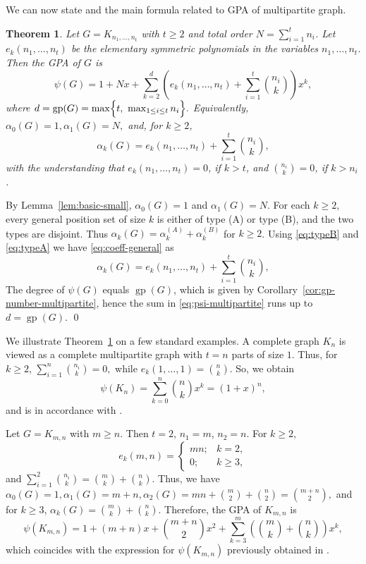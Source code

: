 \documentclass[12pt,twoside]{article}
\newtheorem{theorem}{Theorem}[section]
\renewenvironment{proof}{{\noindent\bfseries Proof.}}{\qed}
\begin{document}
	We can now state and the main formula related to  GPA of multipartite graph.
		\begin{theorem}\label{thm:psi-multipartite}
		Let \(G=K_{n_1,\dots,n_t}\) with \(t\ge 2\) and total order \(N=\sum_{i=1}^t n_i\). Let \(e_k(n_1,\dots,n_t)\) be the elementary symmetric polynomials in the variables \(n_1,\dots,n_t\). Then the GPA of \(G\) is
		\begin{equation}\label{eq:psi-multipartite}
			\psi(G)
			= 1 + N x + \sum_{k=2}^{d} \left( e_k(n_1,\dots,n_t) + \sum_{i=1}^t \binom{n_i}{k} \right)x^k,
		\end{equation}
		where $d = \operatorname{gp}(G) 
		= \max\Bigl\{ t,\ \max_{1\le i\le t} n_i \Bigr\}.$ Equivalently, $\alpha_0(G)=1, \alpha_1(G)=N,$ and, for \(k\ge 2\),
		\begin{equation}\label{eq:coeff-general}
			\alpha_k(G)
			= e_k(n_1,\dots,n_t) + \sum_{i=1}^t \binom{n_i}{k},
		\end{equation}
		with the understanding that \(e_k(n_1,\dots,n_t)=0\), if \(k>t\), and \(\binom{n_i}{k}=0\), if \(k>n_i\).
	\end{theorem}
	
	\begin{proof}
		By Lemma~\ref{lem:basic-small}, \(\alpha_0(G)=1\) and \(\alpha_1(G)=N\). For each \(k\ge 2\), every general position set of size \(k\) is either of type (A) or type (B), and the two types are disjoint. Thus $\alpha_k(G)=\alpha_k^{(A)}+\alpha_k^{(B)}$ 	for \(k\ge 2\). Using \eqref{eq:typeB} and \eqref{eq:typeA} we have \eqref{eq:coeff-general} as
		\[
		\alpha_k(G)=e_k(n_1,\dots,n_t)+\sum_{i=1}^t \binom{n_i}{k},
		\]
		 The degree of \(\psi(G)\) equals \(\operatorname{gp}(G)\), which is given by Corollary~\ref{cor:gp-number-multipartite}, hence the sum in \eqref{eq:psi-multipartite} runs up to \(d=\operatorname{gp}(G)\).
	\end{proof}
	
	 We  illustrate Theorem~\ref{thm:psi-multipartite} on a few standard examples. A complete graph \(K_n\) is viewed as a complete multipartite graph with \(t=n\) parts of size $1$. Thus, for \(k\ge 2\), $\sum_{i=1}^n \binom{n_i}{k} = 0,$ while
		$e_k(1,\dots,1)=\binom{n}{k}.$ So, we obtain
		\[
		\psi(K_n)=\sum_{k=0}^n \binom{n}{k}x^k = (1+x)^n,
		\]
		and is in accordance with \cite[Proposition 2.1(i)]{0}.
	
	Let \(G=K_{m,n}\) with \(m\ge n\). Then \(t=2\), \(n_1=m\), \(n_2=n\). For \(k\ge 2\),
		\[
		e_k(m,n)
		=
		\begin{cases}
			mn; & k=2,\\
			0; & k\ge 3,
		\end{cases}
		\]
		and $\sum_{i=1}^2 \binom{n_i}{k}= \binom{m}{k}+\binom{n}{k}.$ Thus, we have $\alpha_0(G)=1, \alpha_1(G)=m+n,
		\alpha_2(G)=mn+\binom{m}{2}+\binom{n}{2}=\binom{m+n}{2},$ 
		and for \(k\ge 3\), $\alpha_k(G)=\binom{m}{k}+\binom{n}{k}.$ 
		Therefore, the GPA of $K_{m,n}$ is
		\[
		\psi(K_{m,n})
		= 1 + (m+n)x + \binom{m+n}{2}x^2
		+ \sum_{k=3}^{m}\left(\binom{m}{k}+\binom{n}{k}\right)x^k,
		\]
		which coincides with the expression for \(\psi(K_{m,n})\) previously obtained in \cite[Proposition 2.1(v)]{0}. 
	
\end{document}
